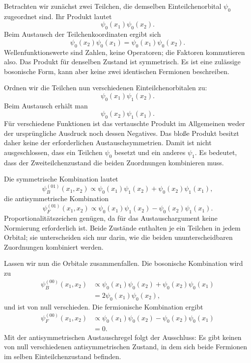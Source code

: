 Betrachten wir zunächst zwei Teilchen, die demselben Einteilchenorbital \(\psi_0\) zugeordnet sind. Ihr Produkt lautet
\begin{equation}
\psi_0(x_1)\psi_0(x_2).
\end{equation}
Beim Austausch der Teilchenkoordinaten ergibt sich
\begin{equation}
\psi_0(x_2)\psi_0(x_1)
=
\psi_0(x_1)\psi_0(x_2).
\end{equation}
Wellenfunktionswerte sind Zahlen, keine Operatoren; die Faktoren kommutieren also. Das Produkt für denselben Zustand ist symmetrisch. Es ist eine zulässige bosonische Form, kann aber keine zwei identischen Fermionen beschreiben.

Ordnen wir die Teilchen nun verschiedenen Einteilchenorbitalen zu:
\begin{equation}
\psi_0(x_1)\psi_1(x_2).
\end{equation}
Beim Austausch erhält man
\begin{equation}
\psi_0(x_2)\psi_1(x_1).
\end{equation}
Für verschiedene Funktionen ist das vertauschte Produkt im Allgemeinen weder der ursprüngliche Ausdruck noch dessen Negatives. Das bloße Produkt besitzt daher keine der erforderlichen Austauschsymmetrien. Damit ist nicht ausgeschlossen, dass ein Teilchen \(\psi_0\) besetzt und ein anderes \(\psi_1\). Es bedeutet, dass der Zweiteilchenzustand die beiden Zuordnungen kombinieren muss.

Die symmetrische Kombination lautet
\begin{equation}
\psi_B^{(01)}(x_1,x_2)
\propto
\psi_0(x_1)\psi_1(x_2)
+
\psi_0(x_2)\psi_1(x_1),
\end{equation}
die antisymmetrische Kombination
\begin{equation}
\psi_F^{(01)}(x_1,x_2)
\propto
\psi_0(x_1)\psi_1(x_2)
-
\psi_0(x_2)\psi_1(x_1).
\end{equation}
Proportionalitätszeichen genügen, da für das Austauschargument keine Normierung erforderlich ist. Beide Zustände enthalten je ein Teilchen in jedem Orbital; sie unterscheiden sich nur darin, wie die beiden ununterscheidbaren Zuordnungen kombiniert werden.

Lassen wir nun die Orbitale zusammenfallen. Die bosonische Kombination wird zu
\begin{align}
\psi_B^{(00)}(x_1,x_2)
&\propto
\psi_0(x_1)\psi_0(x_2)
+
\psi_0(x_2)\psi_0(x_1)\\
&=
2\psi_0(x_1)\psi_0(x_2),
\end{align}
und ist von null verschieden. Die fermionische Kombination ergibt
\begin{align}
\psi_F^{(00)}(x_1,x_2)
&\propto
\psi_0(x_1)\psi_0(x_2)
-
\psi_0(x_2)\psi_0(x_1)\\
&=0.
\end{align}
Mit der antisymmetrischen Austauschregel folgt der Ausschluss: Es gibt keinen von null verschiedenen antisymmetrischen Zustand, in dem sich beide Fermionen im selben Einteilchenzustand befinden.

